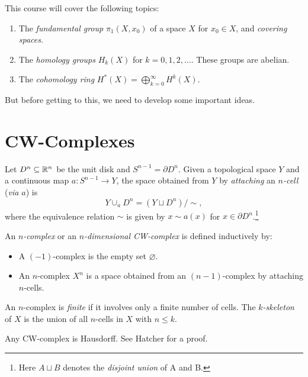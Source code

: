 This course will cover the following topics:
\begin{enumerate}
  \item The \emph{fundamental group}
    $\pi_1(X, x_0)$ of a space $X$ for $x_0 \in X$,
    and \emph{covering spaces}.
  \item The \emph{homology groups} $H_k(X)$ for
    $k = 0, 1, 2, \dots$. These groups are abelian.
  \item The \emph{cohomology ring}
    $H^*(X) = \bigoplus_{k = 0}^\infty H^k(X)$.
\end{enumerate}
But before getting to this, we need to develop some
important ideas.

\section{CW-Complexes}

\begin{definition}
  Let $D^n \subseteq \mathbb{R}^n$ be the unit disk and
  $S^{n - 1} = \partial D^n$. Given a topological
  space $Y$ and a continuous map $a : S^{n - 1} \to Y$,
  the space obtained from $Y$ by \emph{attaching} an
  \emph{$n$-cell} (\emph{via $a$}) is
  \[
    Y \cup_a D^n = (Y \sqcup D^n) / {\sim},
  \]
  where the equivalence relation $\sim$ is given by
  $x \sim a(x)$ for $x \in \partial D^n$.\footnote{Here $A \sqcup B$ denotes the \emph{disjoint union} of A and B.}
\end{definition}

\begin{definition}
  An \emph{$n$-complex} or an \emph{$n$-dimensional CW-complex}
  is defined inductively by:
  \begin{itemize}
    \item A $(-1)$-complex is the empty set $\varnothing$.
    \item An $n$-complex $X^n$ is a space obtained
      from an $(n - 1)$-complex by attaching $n$-cells.
  \end{itemize}
  An $n$-complex is \emph{finite} if it involves
  only a finite number of cells. The \emph{$k$-skeleton}
  of $X$ is the union of all $n$-cells in $X$
  with $n \le k$.
\end{definition}

\begin{remark}
  Any CW-complex is Hausdorff. See Hatcher for a proof.
\end{remark}

